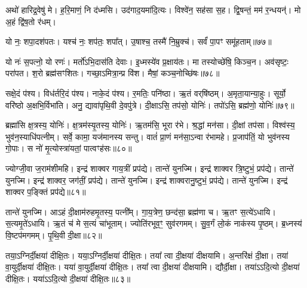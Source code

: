 अथो॑ हारिद्र॒वेषु॑ मे।
ह॒रि॒माणं॒ नि द॑ध्मसि।
उद॑गाद॒यमा॑दि॒त्यः।
विश्वे॑न॒ सह॑सा स॒ह।
द्वि॒षन्तं॒ मम॑ र॒न्धयन्॑।
मो अ॒हं द्वि॑ष॒तो र॑धम्।

{\small \closesub{}}

यो नः॒ शपा॒दश॑पतः।
यश्च॑ नः॒ शप॑तः॒ शपा᳚त्।
उ॒षाश्च॒ तस्मै॑ नि॒म्रुक्च॑।
सर्वं॑ पा॒पꣳ समू॑हताम्॥७७॥\ip

यो नः॑ स॒पत्नो॒ यो रणः॑।
मर्तो॑\-ऽभि॒दास॑ति देवाः।
इ॒ध्मस्ये॑व प्र॒क्षाय॑तः।
मा तस्योच्छे॑षि॒ किञ्च॒न।
अव॑सृष्टः॒ परा॑पत।
श॒रो ब्रह्म॑सꣳशितः।
गच्छा॒\-ऽमित्रा॒न्प्र वि॑श।
मैषां॒ कञ्च॒नोच्छि॑षः॥७८॥\ip{}

सक्षे॒दं प॑श्य।
विध॑र्तरि॒दं प॑श्य।
नाके॒दं प॑श्य।
र॒मतिः॒ पनि॑ष्ठा।
ऋ॒तं वर्‌\mbox{}षि॑ष्ठम्।
अ॒मृता॒यान्या॒हुः।
सूर्यो॒ वरि॑ष्ठो अ॒क्षभि॒र्विभा॑ति।
अनु॒ द्यावा॑पृथि॒वी दे॒वपु॑त्रे।
दी॒क्षाऽसि॒ तप॑सो॒ योनिः॑।
तपो॑ऽसि॒ ब्रह्म॑णो॒ योनिः॑॥७९॥\ip

ब्रह्मा॑सि क्ष॒त्रस्य॒ योनिः॑।
क्ष॒त्रम॑स्यृ॒तस्य॒ योनिः॑।
ऋ॒तम॑सि॒ भूरा र॑भे।
श्र॒द्धां मन॑सा।
दी॒क्षां तप॑सा।
विश्व॑स्य॒ भुव॑न॒स्याधि॑पत्नीम्।
सर्वे॒ कामा॒ यज॑मानस्य सन्तु।
वातं॑ प्रा॒णं मन॑सा॒\-ऽन्वा र॑भामहे।
प्र॒जा\-प॑तिं॒ यो भुव॑नस्य गो॒पाः।
स नो॑ मृ॒त्योस्त्रा॑यतां॒ पात्वꣳह॑सः॥८०॥\ip

ज्योग्जी॒वा ज॒राम॑शीमहि।
इन्द्र॑ शाक्वर गाय॒त्रीं प्रप॑द्ये।
तान्ते॑ युनज्मि।
इन्द्र॑ शाक्वर त्रि॒ष्टुभं॒ प्रप॑द्ये।
तान्ते॑ युनज्मि।
इन्द्र॑ शाक्वर॒ जग॑तीं॒ प्रप॑द्ये।
तान्ते॑ युनज्मि।
इन्द्र॑ शाक्वरानु॒ष्टुभं॒ प्रप॑द्ये।
तान्ते॑ युनज्मि।
इन्द्र॑ शाक्वर प॒ङ्क्तिं प्रप॑द्ये॥८१॥\ip

तान्ते॑ युनज्मि।
आऽहं दी॒क्षाम॑रुहमृ॒तस्य॒ पत्नी᳚म्।
गा॒य॒त्रेण॒ छन्द॑सा॒ ब्रह्म॑णा च।
ऋ॒तꣳ स॒त्ये॑\-ऽधायि।
स॒त्यमृ॒ते॑\-ऽधायि।
ऋ॒तं च॑ मे स॒त्यं चा॑भूताम्।
ज्योति॑रभूव॒ꣳ॒ सुव॑रगमम्।
सु॒व॒र्गं लो॒कं नाक॑स्य पृ॒ष्ठम्।
ब्र॒ध्नस्य॑ वि॒ष्टप॑मगमम्।
पृ॒थि॒वी दी॒क्षा॥८२॥\ip

तया॒ऽग्निर्दी॒क्षया॑ दीक्षि॒तः।
यया॒ऽग्निर्दी॒क्षया॑ दीक्षि॒तः।
तया᳚ त्वा दी॒क्षया॑ दीक्षयामि।
अ॒न्तरि॑क्षं दी॒क्षा।
तया॑ वा॒युर्दी॒क्षया॑ दीक्षि॒तः।
यया॑ वा॒युर्दी॒क्षया॑ दीक्षि॒तः।
तया᳚ त्वा दी॒क्षया॑ दीक्षयामि।
द्यौर्दी॒क्षा।
तया॑ऽऽदि॒त्यो दी॒क्षया॑ दीक्षि॒तः।
यया॑ऽऽदि॒त्यो दी॒क्षया॑ दीक्षि॒तः॥८३॥\ip

